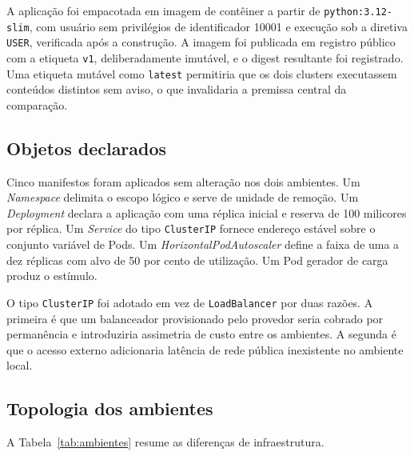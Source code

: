 \documentclass[12pt]{article}
\begin{document}
A aplicação foi empacotada em imagem de contêiner a partir de \texttt{python:3.12-slim},
com usuário sem privilégios de identificador 10001 e execução sob a diretiva
\texttt{USER}, verificada após a construção. A imagem foi publicada em registro
público com a etiqueta \texttt{v1}, deliberadamente imutável, e o digest
resultante foi registrado. Uma etiqueta mutável como \texttt{latest} permitiria
que os dois clusters executassem conteúdos distintos sem aviso, o que
invalidaria a premissa central da comparação.

\subsection{Objetos declarados}

Cinco manifestos foram aplicados sem alteração nos dois ambientes. Um
\emph{Namespace} delimita o escopo lógico e serve de unidade de remoção. Um
\emph{Deployment} declara a aplicação com uma réplica inicial e reserva de 100
milicores por réplica. Um \emph{Service} do tipo \texttt{ClusterIP} fornece
endereço estável sobre o conjunto variável de Pods. Um
\emph{HorizontalPodAutoscaler} define a faixa de uma a dez réplicas com alvo de
50 por cento de utilização. Um Pod gerador de carga produz o estímulo.

O tipo \texttt{ClusterIP} foi adotado em vez de \texttt{LoadBalancer} por duas
razões. A primeira é que um balanceador provisionado pelo provedor seria cobrado
por permanência e introduziria assimetria de custo entre os ambientes. A segunda
é que o acesso externo adicionaria latência de rede pública inexistente no
ambiente local.

\subsection{Topologia dos ambientes}

A Tabela~\ref{tab:ambientes} resume as diferenças de infraestrutura.
\end{document}
